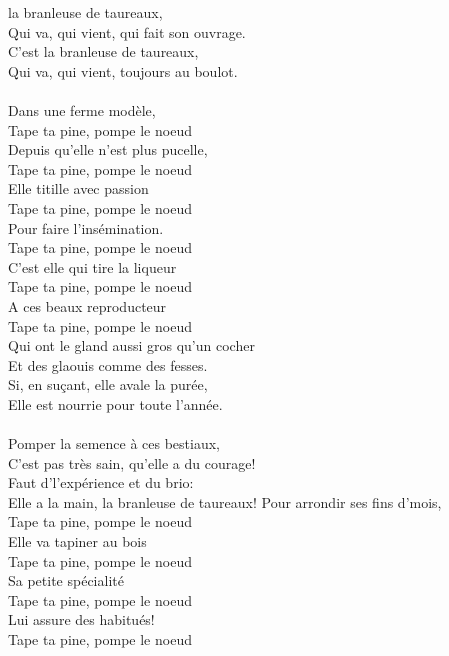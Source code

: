 %
 la branleuse de taureaux,
\\Qui va, qui vient, qui fait son ouvrage.
\\C'est la branleuse de taureaux,
\\Qui va, qui vient, toujours au boulot.
\\\\Dans une ferme modèle, 
\\ Tape ta pine, pompe le noeud
\\Depuis qu'elle n'est plus pucelle, 
\\ Tape ta pine, pompe le noeud
\\Elle titille avec passion
\\ Tape ta pine, pompe le noeud
\\Pour faire l'insémination. 
\\ Tape ta pine, pompe le noeud
\\C'est elle qui tire la liqueur
\\ Tape ta pine, pompe le noeud
\\A ces beaux reproducteur
\\ Tape ta pine, pompe le noeud
\\Qui ont le gland aussi gros qu'un cocher
\\Et des glaouis comme des fesses.
\\Si, en suçant, elle avale la purée,
\\Elle est nourrie pour toute l'année.
\\\\Pomper la semence à ces  bestiaux,
\\C'est pas très sain, qu'elle a du courage!
\\Faut d'l'expérience et du brio:
\\Elle a la main, la branleuse de taureaux!
\breakpage
Pour arrondir ses fins d'mois, 
\\ Tape ta pine, pompe le noeud
\\Elle va tapiner au bois 
\\ Tape ta pine, pompe le noeud
\\Sa petite spécialité 
\\ Tape ta pine, pompe le noeud
\\Lui assure des habitués! 
\\ Tape ta pine, pompe le noeud
